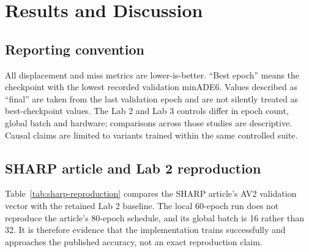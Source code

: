 \chapter{Results and Discussion}
\label{chap:results}

\section{Reporting convention}

All displacement and miss metrics are lower-is-better. ``Best epoch'' means the checkpoint with the lowest recorded validation minADE6. Values described as ``final'' are taken from the last validation epoch and are not silently treated as best-checkpoint values. The Lab 2 and Lab 3 controls differ in epoch count, global batch and hardware; comparisons across those studies are descriptive. Causal claims are limited to variants trained within the same controlled suite.

\section{SHARP article and Lab 2 reproduction}

Table~\ref{tab:sharp-reproduction} compares the SHARP article's AV2 validation vector with the retained Lab 2 baseline. The local 60-epoch run does not reproduce the article's 80-epoch schedule, and its global batch is 16 rather than 32. It is therefore evidence that the implementation trains successfully and approaches the published accuracy, not an exact reproduction claim.

\begin{table}[htbp]
\centering
\caption{SHARP article AV2 validation result and retained Lab 2 reproduction.}
\label{tab:sharp-reproduction}
\end{table}

